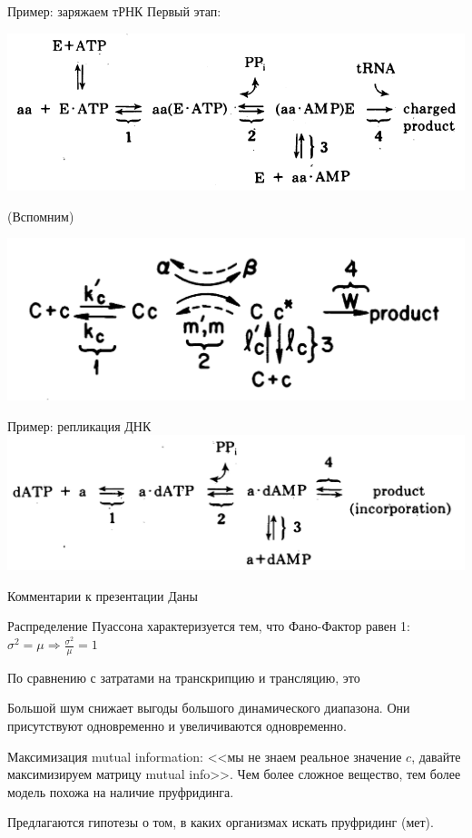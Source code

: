 \documentclass{beamer}
\begin{document}
\begin{frame}{Пример: заряжаем тРНК}
Первый этап:

\centering \includegraphics[width=.7\textwidth]{reaction_trna}

\flushleft (Вспомним)

\centering \includegraphics[width=.4\textwidth]{reaction8}

\end{frame}

\begin{frame}{Пример: репликация ДНК}
    \centering \includegraphics[width=.7\textwidth]{reaction_dna}

\end{frame}

\begin{frame}{Комментарии к презентации Даны}

Распределение Пуассона характеризуется тем, что Фано-Фактор равен 1: $ \sigma^2 = \mu \Rightarrow \frac{\sigma^2}{\mu} = 1 $

По сравнению с затратами на транскрипцию и трансляцию, это

Большой шум снижает выгоды большого динамического диапазона.
Они присутствуют одновременно и увеличиваются одновременно.

Максимизация mutual information: <<мы не знаем реальное значение $c$, давайте максимизируем матрицу mutual info>>.
Чем более сложное вещество, тем более модель похожа на наличие пруфридинга.

Предлагаются гипотезы о том, в каких организмах искать пруфридинг (мет).

\end{frame}
\end{document}
